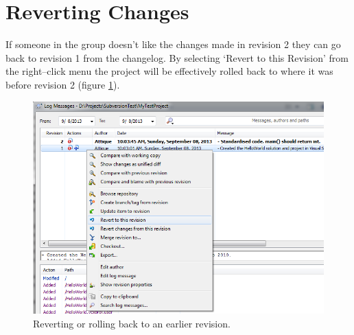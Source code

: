 \documentclass[12pt,a4paper]{article}
\begin{document}
\section{Reverting Changes}
If someone in the group doesn't like the changes made in revision 2 they can go back to revision 1 from the changelog. By selecting `Revert to this Revision' from the right--click menu the project will be effectively rolled back to where it was before revision 2 (figure \ref{reverting}).
\begin{figure}[H]
\centering
\includegraphics[scale=0.65]{Reverting.png}
\caption{Reverting or rolling back to an earlier revision.}
\label{reverting}
\end{figure}


\end{document}
